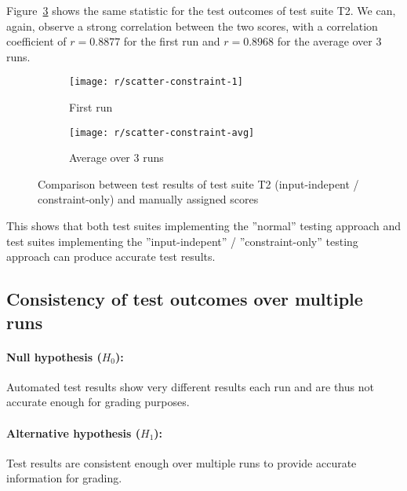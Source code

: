 Figure~\ref{fig:scatter_constraint} shows the same statistic for the test outcomes of test suite T2.
We can, again, observe a strong correlation between the two scores,
with a correlation coefficient of $r = 0.8877$ for the first run and $r = 0.8968$ for the average over 3 runs.


\begin{figure}[htpb]
    \centering
    \begin{subfigure}{.50\textwidth}
        \texttt{[image: r/scatter-constraint-1]}
        \caption{First run}
        \label{fig:scatter_constraint_1}
    \end{subfigure}%
    \begin{subfigure}{.50\textwidth}
        \texttt{[image: r/scatter-constraint-avg]}
        \caption{Average over 3 runs}
        \label{fig:scatter_constraint_avg}
    \end{subfigure}
    \caption{Comparison between test results of test suite T2 (input-indepent / constraint-only) and manually assigned scores}
    \label{fig:scatter_constraint}
\end{figure}

This shows that both test suites implementing the ''normal'' testing approach and
test suites implementing the ''input-indepent'' / ''constraint-only'' testing approach
can produce accurate test results.

\subsection{Consistency of test outcomes over multiple runs}


\paragraph{Null hypothesis ($H_0$):}
Automated test results show very different results each run and are thus not accurate enough for grading purposes.
\vspace{-\medskipamount}
\paragraph{Alternative hypothesis ($H_1$):}
Test results are consistent enough over multiple runs to provide accurate information for grading.

